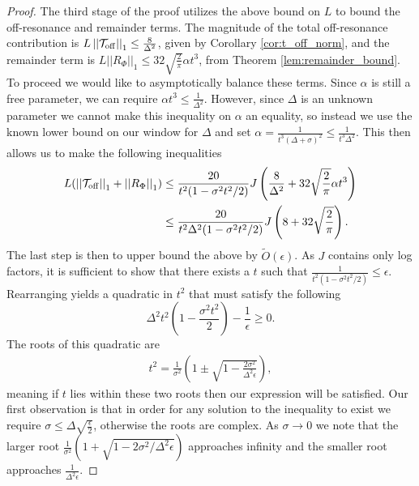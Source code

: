 \documentclass{article}
\newcommand{\off}{\rm off}
\newcommand{\norm}[1]{\left| \left| #1 \right| \right|}
\newcommand{\bigotilde}[1]{\widetilde{O} \left( #1 \right)}
\begin{document}
\begin{proof}
 The third stage of the proof utilizes the above bound on $L$ to bound the  off-resonance and remainder terms. The magnitude of the total off-resonance contribution is $L \norm{\mathcal{T}_{\off}}_1 \le \frac{8 }{\Delta^2}$, given by Corollary \ref{cor:t_off_norm}, and the remainder term is $L \norm{R_{\Phi}}_1 \le 32 \sqrt{\frac{2}{\pi}} \alpha t^3$, from Theorem \ref{lem:remainder_bound}. To proceed we would like to asymptotically balance these terms. Since $\alpha$ is still a free parameter, we can require $\alpha t^3 \le \frac{1}{\Delta^2}$. However, since $\Delta$ is an unknown parameter we cannot make this inequality on $\alpha$ an equality, so instead we use the known lower bound on our window for $\Delta$ and set $\alpha = \frac{1}{t^3(\Delta + \sigma)^2} \le \frac{1}{t^3 \Delta^2}$. This then allows us to make the following inequalities
 \begin{align}
     L(\norm{\mathcal{T}_{\off}}_1 + \norm{R_{\Phi}}_1) &\le \frac{20}{t^2(1 - \sigma^2 t^2 / 2)}J \left( \frac{8}{\Delta^2} + 32 \sqrt{\frac{2}{\pi}} \alpha t^3 \right) \\
    &\le \frac{20}{t^2 \Delta^2 (1 - \sigma^2 t^2 / 2)}J \left( 8 + 32 \sqrt{\frac{2}{\pi}}\right). \label{eq:single_qubit_tmp_2}
 \end{align}
The last step is then to upper bound the above by $\bigotilde{\epsilon}$. As $J$ contains only log factors, it is sufficient to show that there exists a $t$ such that $\frac{1}{t^2(1 - \sigma^2 t^2 / 2)} \le \epsilon$. Rearranging yields a quadratic in $t^2$ that must satisfy the following
\begin{equation}
    \Delta^2 t^2 \left(1 - \frac{\sigma^2 t^2}{2}\right) - \frac{1}{\epsilon} \ge 0. \label{eq:single_qubit_tmp_3}
\end{equation}
The roots of this quadratic are
\begin{align}
    t^2 = \frac{1}{\sigma^2}\left(1 \pm \sqrt{1 - \frac{2 \sigma^2}{\Delta^2 \epsilon}} \right),
\end{align}
meaning if $t$ lies within these two roots then our expression will be satisfied. Our first observation is that in order for any solution to the inequality to exist we require $\sigma \le \Delta \sqrt{\frac{\epsilon}{2}}$, otherwise the roots are complex. As $\sigma \to 0$ we note that the larger root $\frac{1}{\sigma^2}(1 + \sqrt{1 - 2 \sigma^2 / \Delta^2 \epsilon})$ approaches infinity and the smaller root approaches $\frac{1}{\Delta^2 \epsilon}$.


\end{proof}
\end{document}
